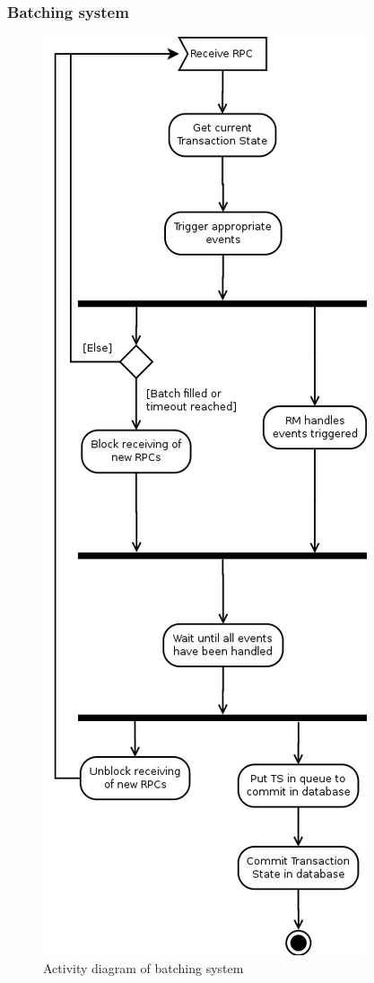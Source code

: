 \documentclass{beamer}
\begin{document}
\begin{frame}
\frametitle{Batching system}

\begin{figure}
\centering
\includegraphics[scale=0.17]{resources/rpc_batch_system_activity.png}
\caption{Activity diagram of batching system}
\end{figure}
\end{frame}
\end{document}

